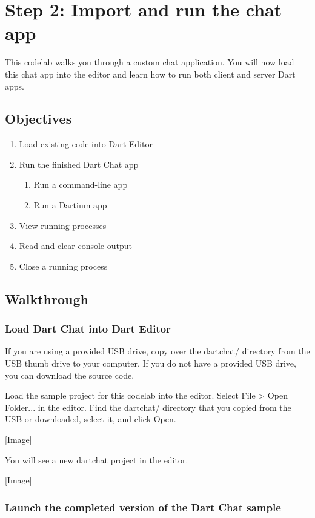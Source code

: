 \section{Step 2: Import and run the chat app}

This codelab walks you through a custom chat application. You will now load this chat app into the editor and learn how to run both client and server Dart apps.

\subsection{Objectives}

\begin{enumerate}
\item Load existing code into Dart Editor
\item Run the finished Dart Chat app
\begin{enumerate}
\item Run a command-line app
\item Run a Dartium app
\end{enumerate}
\item View running processes
\item Read and clear console output
\item Close a running process
\end{enumerate}

\subsection{Walkthrough}

\subsubsection{Load Dart Chat into Dart Editor}

If you are using a provided USB drive, copy over the dartchat/ directory from the USB thumb drive to your computer. If you do not have a provided USB drive, you can download the source code.

Load the sample project for this codelab into the editor. Select File > Open Folder... in the editor. Find the dartchat/ directory that you copied from the USB or downloaded, select it, and click Open.

[Image]

You will see a new dartchat project in the editor.

[Image]

\subsubsection{Launch the completed version of the Dart Chat sample}

